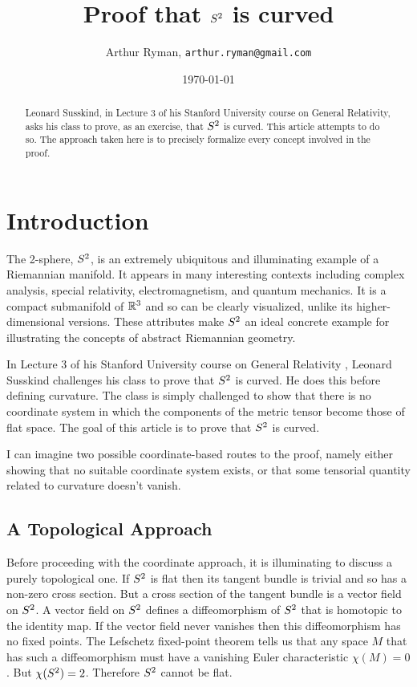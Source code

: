 \documentclass[11pt, oneside]{article}
\title{Proof that $S^2$ is curved}
\author{Arthur Ryman, {\tt arthur.ryman@gmail.com}}
\date{\today}
\begin{document}
\maketitle

\begin{abstract}
Leonard Susskind,  in Lecture 3 of his Stanford University course on General Relativity,
asks his class to prove, as an exercise, that $S^2$ is curved.
This article attempts to do so.
The approach taken here is to precisely formalize every concept involved in the proof.
\end{abstract}

\section{Introduction}

The 2-sphere, $S^2$, is an extremely ubiquitous and illuminating example of a Riemannian manifold.
It appears in many interesting contexts including complex analysis, special relativity, electromagnetism, and quantum mechanics.
It is a compact submanifold of $\mathbb{R}^3$ and so can be clearly visualized, unlike its higher-dimensional versions.
These attributes make $S^2$ an ideal concrete example for illustrating the concepts of 
abstract Riemannian geometry.

In Lecture 3 of his Stanford University course on General Relativity \cite{susskind-gr3},
Leonard Susskind challenges his class to prove that $S^2$ is curved.
He does this before defining curvature.
The class is simply challenged to show that there is no coordinate system in which the components
of the metric tensor become those of flat space.
The goal of this article is to prove that $S^2$ is curved.

I can imagine two possible coordinate-based routes to the proof, 
namely either showing that no suitable coordinate system exists, 
or that some tensorial quantity related to curvature doesn't vanish.

\subsection{A Topological Approach}

Before proceeding with the coordinate approach, it is illuminating to discuss a purely topological one.
If $S^2$ is flat then its tangent bundle is trivial and so has a non-zero cross section.
But a cross section of the tangent bundle is a vector field on $S^2$.
A vector field on $S^2$ defines a diffeomorphism of $S^2$ that is homotopic to the identity map.
If the vector field never vanishes then this diffeomorphism has no fixed points.
The Lefschetz fixed-point theorem tells us that any space $M$ that has such a diffeomorphism must have a vanishing Euler characteristic
$\chi(M) = 0$. But $\chi(S^2) = 2$. Therefore $S^2$ cannot be flat.
\end{document}
